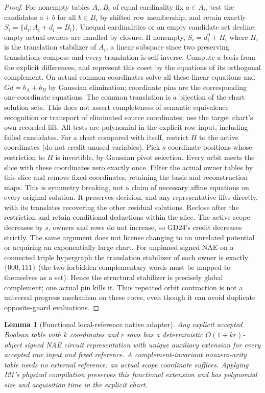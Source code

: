 \documentclass[11pt]{article}
\newtheorem{lemma}[theorem]{Lemma}
\begin{document}
\begin{proof}
For nonempty tables $A_i,B_i$ of equal cardinality fix $a\in A_i$, test the candidates $a+b$ for all $b\in B_i$ by shifted row membership, and retain exactly $S_i=\{d_i:A_i+d_i=B_i\}$. Unequal cardinalities or an empty candidate set decline; empty actual owners are handled by closure. If nonempty, $S_i=d_i^0+H_i$ where $H_i$ is the translation stabilizer of $A_i$, a linear subspace since two preserving translations compose and every translation is self-inverse. Compute a basis from the explicit differences, and represent this coset by the equations of its orthogonal complement. On actual common coordinates solve all these linear equations and $Gd=b_A+b_B$ by Gaussian elimination; coordinate pins are the corresponding one-coordinate equations. The common translation is a bijection of the chart solution sets. This does not assert completeness of semantic equivalence recognition or transport of eliminated source coordinates; use the target chart's own recorded lift. All tests are polynomial in the explicit row input, including failed candidates.
For a chart compared with itself, restrict $H$ to the active coordinates (do not credit unused variables). Pick $s$ coordinate positions whose restriction to $H$ is invertible, by Gaussian pivot selection. Every orbit meets the slice with these coordinates zero exactly once. Filter the actual owner tables by this slice and remove fixed coordinates, retaining the basis and reconstruction maps. This is symmetry breaking, not a claim of necessary affine equations on every original solution. It preserves decision, and any representative lifts directly, with its translates recovering the other residual solutions. Reclose after the restriction and retain conditional deductions within the slice. The active scope decreases by $s$, owners and rows do not increase, so GD24's credit decreases strictly. The same argument does not license changing to an unrelated potential or acquiring an exponentially large chart. For unpinned signed NAE on a connected triple hypergraph the translation stabilizer of each owner is exactly $\{000,111\}$ (the two forbidden complementary words must be mapped to themselves as a set). Hence the structural stabilizer is precisely global complement; one actual pin kills it. Thus repeated orbit contraction is not a universal progress mechanism on these cores, even though it can avoid duplicate opposite-guard evaluations.
\end{proof}
\begin{lemma}[Functional local-reference native adapter]\label{lem:bw18-native}
Any explicit accepted Boolean table with $k$ coordinates and $r$ rows has a deterministic $O(1+kr)$-object signed NAE circuit representation with unique auxiliary extension for every accepted raw input and fixed reference. A complement-invariant nonzero-arity table needs no external reference: an actual scope coordinate suffices. Applying I21's physical compilation preserves this functional extension and has polynomial size and acquisition time in the explicit chart.
\end{lemma}
\end{document}

